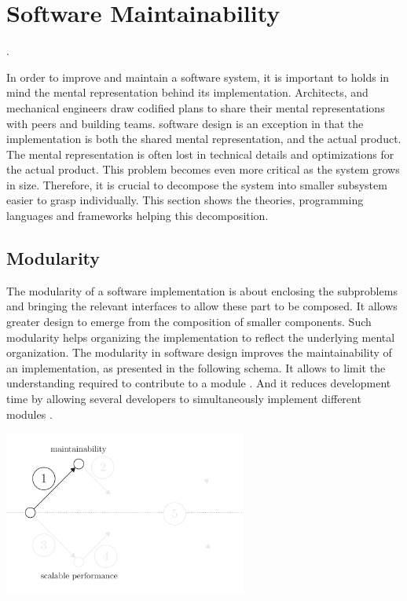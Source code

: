 \section{Software Maintainability} \label{chapter3:software-maintainability}

.

In order to improve and maintain a software system, it is important to holds in mind the mental representation behind its implementation.
Architects, and mechanical engineers draw codified plans to share their mental representations with peers and building teams.
software design is an exception in that the implementation is both the shared mental representation, and the actual product.
The mental representation is often lost in technical details and optimizations for the actual product.
This problem becomes even more critical as the system grows in size.
Therefore, it is crucial to decompose the system into smaller subsystem easier to grasp individually.
This section shows the theories, programming languages and frameworks helping this decomposition.

\subsection{Modularity} \label{chapter3:software-maintainability:modularity}

The modularity of a software implementation is about enclosing the subproblems and bringing the relevant interfaces to allow these part to be composed.
It allows greater design to emerge from the composition of smaller components.
Such modularity helps organizing the implementation to reflect the underlying mental organization.
The modularity in software design improves the maintainability of an implementation, as presented in the following schema.
It allows to limit the understanding required to contribute to a module \cite{Stevens1974}.
And it reduces development time by allowing several developers to simultaneously implement different modules \cite{Wong2009,Cataldo2006}.

\begin{center}
\includegraphics[width=0.6\textwidth]{../ressources/state-of-the-art-1.pdf}
\end{center}

